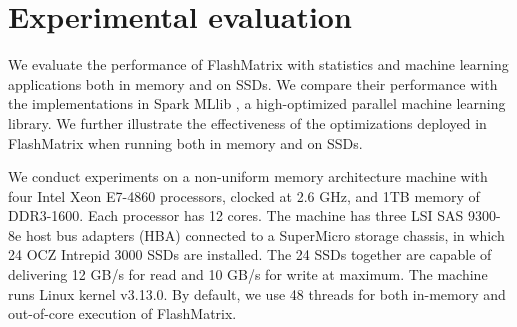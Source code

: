 \section{Experimental evaluation}
We evaluate the performance of FlashMatrix with statistics and machine learning
applications both in memory and on SSDs. We compare their performance with
the implementations in Spark MLlib \cite{mllib}, a high-optimized parallel
machine learning library. We further
illustrate the effectiveness of the optimizations deployed in FlashMatrix
when running both in memory and on SSDs.

We conduct experiments on a non-uniform memory architecture machine with
four Intel Xeon E7-4860 processors, clocked at 2.6 GHz, and 1TB memory of
DDR3-1600. Each processor has 12 cores. The machine has three LSI SAS 9300-8e
host bus adapters (HBA) connected to a SuperMicro storage chassis, in which
24 OCZ Intrepid 3000 SSDs are installed. The 24 SSDs together are capable of
delivering 12 GB/s for read and 10 GB/s for write at maximum. The machine runs
Linux kernel v3.13.0. By default, we use 48 threads for both in-memory and
out-of-core execution of FlashMatrix.

